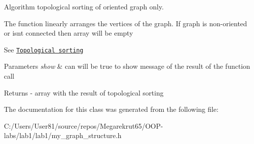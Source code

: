 Algorithm topological sorting of oriented graph only. 

The function linearly arranges the vertices of the graph. If graph is non-\/oriented or isn\textquotesingle{}t connected then array will be empty

See \href{https://en.wikipedia.org/wiki/Topological_sorting}{\tt Topological sorting} 
\begin{DoxyParams}{Parameters}
{\em show} & can will be true to show message of the result of the function call \\
\hline
\end{DoxyParams}
\begin{DoxyReturn}{Returns}
-\/ array with the result of topological sorting 
\end{DoxyReturn}


The documentation for this class was generated from the following file\+:\begin{DoxyCompactItemize}
\item 
C\+:/\+Users/\+User81/source/repos/\+Megarekrut65/\+O\+O\+P-\/labs/lab1/lab1/my\+\_\+graph\+\_\+structure.\+h\end{DoxyCompactItemize}
